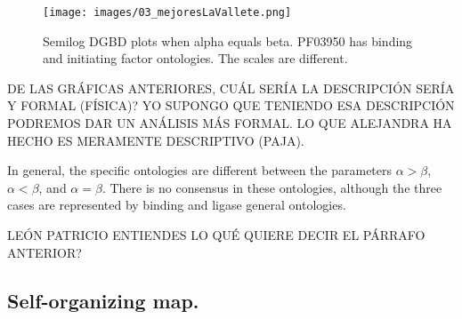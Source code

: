 \documentclass[preprint,12pt]{elsarticle}
\begin{document}
\begin{figure} %
    \centering
    \texttt{[image: images/03\_mejoresLaVallete.png]}
    \bigbreak
    \caption {Semilog DGBD plots when alpha equals beta. PF03950 has binding and initiating factor ontologies. The scales are different.}
    \label{fig:alphabeta}
\end{figure}
\clearpage


\par DE LAS GRÁFICAS ANTERIORES, CUÁL SERÍA LA DESCRIPCIÓN SERÍA Y FORMAL (FÍSICA)? YO SUPONGO QUE TENIENDO ESA DESCRIPCIÓN PODREMOS DAR UN ANÁLISIS MÁS FORMAL. LO QUE ALEJANDRA HA HECHO ES MERAMENTE DESCRIPTIVO (PAJA). \par
 
In general, the specific ontologies are different between the parameters $\alpha > \beta$, $\alpha < \beta $, and $\alpha = \beta $. There is no consensus in these ontologies, although the three cases are represented by binding and ligase general ontologies. \par LEÓN PATRICIO ENTIENDES LO QUÉ QUIERE DECIR EL PÁRRAFO ANTERIOR? \par


\subsection{\textbf{Self-organizing map.}}
\end{document}

